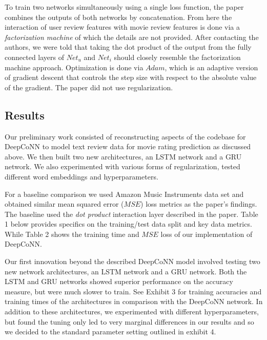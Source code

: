 \documentclass[10pt,twocolumn,letterpaper]{article}
\begin{document}
To train two networks simultaneously using a single loss function, the paper combines the outputs of both networks by concatenation. From here the interaction of user review features with movie review features is done via a \textit{factorization machine} of which the details are not provided. After contacting the authors, we were told that taking the dot product of the output from the fully connected layers of $Net_{u}$ and $Net_{i}$ should closely resemble the factorization machine approach. Optimization is done via $Adam$, which is an adaptive version of gradient descent that controls the step size with respect to the absolute value of the gradient. The paper did not use regularization.


\subsection{Results}

Our preliminary work consisted of reconstructing aspects of the codebase for DeepCoNN to model text review data for movie rating prediction as discussed above. We then built two new architectures, an LSTM network and a GRU network. We also experimented with various forms of regularization, tested different word embeddings and hyperparameters.

For a baseline comparison we used Amazon Music Instruments data set and obtained similar mean squared error ($MSE$) loss metrics as the paper's findings. The baseline used the \textit{dot product} interaction layer described in the paper. Table 1 below provides specifics on the training/test data split and key data metrics. While Table 2 shows the training time and $MSE$ loss of our implementation of DeepCoNN.

Our first innovation beyond the described DeepCoNN model involved testing two new network architectures, an LSTM network and a GRU network. Both the LSTM and GRU networks showed superior performance on the accuracy measure, but were much slower to train. See Exhibit 3 for training accuracies and training times of the architectures in comparison with the DeepCoNN network.  In addition to these architectures, we experimented with different hyperparameters, but found the tuning only led to very marginal differences in our results and so we decided to the standard parameter setting outlined in exhibit 4. 
\end{document}
